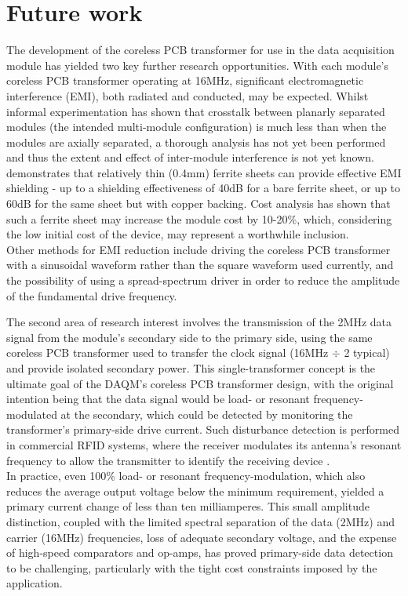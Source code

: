 \documentclass[conference]{IEEEtran}
\begin{document}
\section{Future work}
The development of the coreless PCB transformer for use in the data acquisition module has yielded two key further research opportunities.  
With each module's coreless PCB transformer operating at 16MHz, significant electromagnetic interference (EMI), both radiated and conducted, may be expected.  Whilst informal experimentation has shown that crosstalk between planarly separated modules (the intended multi-module configuration) is much less than when the modules are axially separated, a thorough analysis has not yet been performed and thus the extent and effect of inter-module interference is not yet known.  \cite{EMIShield} demonstrates that relatively thin (0.4mm) ferrite sheets can provide effective EMI shielding - up to a shielding effectiveness of 40dB for a bare ferrite sheet, or up to 60dB for the same sheet but with copper backing.  Cost analysis has shown that such a ferrite sheet may increase the module cost by 10-20\%, which, considering the low initial cost of the device, may represent a worthwhile inclusion.  \\
Other methods for EMI reduction include driving the coreless PCB transformer with a sinusoidal waveform rather than the square waveform used currently, and the possibility of using a spread-spectrum driver in order to reduce the amplitude of the fundamental drive frequency.

The second area of research interest involves the transmission of the 2MHz data signal from the module's secondary side to the primary side, using the same coreless PCB transformer used to transfer the clock signal (16MHz $ \div $ 2 typical) and provide isolated secondary power.  This single-transformer concept is the ultimate goal of the DAQM's coreless PCB transformer design, with the original intention being that the data signal would be load- or resonant frequency-modulated at the secondary, which could be detected by monitoring the transformer's primary-side drive current.  Such disturbance detection is performed in commercial RFID systems, where the receiver modulates its antenna's resonant frequency to allow the transmitter to identify the receiving device \cite{RFID}.  \\
In practice, even 100\% load- or resonant frequency-modulation, which also reduces the average output voltage below the minimum requirement, yielded a primary current change of less than ten milliamperes.  This small amplitude distinction, coupled with the limited spectral separation of the data (2MHz) and carrier (16MHz) frequencies, loss of adequate secondary voltage, and the expense of high-speed comparators and op-amps, has proved primary-side data detection to be challenging, particularly with the tight cost constraints imposed by the application.
\end{document}
